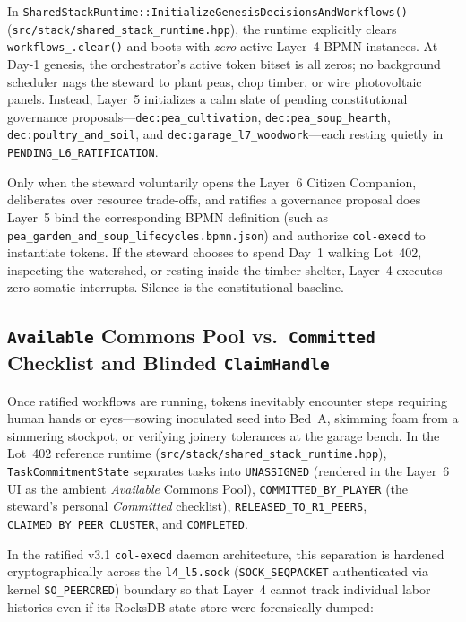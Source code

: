 In \texttt{SharedStackRuntime::InitializeGenesisDecisionsAndWorkflows()} (\texttt{src/stack/shared\_stack\_runtime.hpp}), the runtime explicitly clears \texttt{workflows\_.clear()} and boots with \emph{zero} active Layer~4 BPMN instances. At Day-1 genesis, the orchestrator's active token bitset is all zeros; no background scheduler nags the steward to plant peas, chop timber, or wire photovoltaic panels. Instead, Layer~5 initializes a calm slate of pending constitutional governance proposals---\texttt{dec:pea\_cultivation}, \texttt{dec:pea\_soup\_hearth}, \texttt{dec:poultry\_and\_soil}, and \texttt{dec:garage\_l7\_woodwork}---each resting quietly in \texttt{PENDING\_L6\_RATIFICATION}.

Only when the steward voluntarily opens the Layer~6 Citizen Companion, deliberates over resource trade-offs, and ratifies a governance proposal does Layer~5 bind the corresponding BPMN definition (such as \texttt{pea\_garden\_and\_soup\_lifecycles.bpmn.json}) and authorize \texttt{col-execd} to instantiate tokens. If the steward chooses to spend Day~1 walking Lot~402, inspecting the watershed, or resting inside the timber shelter, Layer~4 executes zero somatic interrupts. Silence is the constitutional baseline.

\subsection{\texttt{Available} Commons Pool vs.\ \texttt{Committed} Checklist and Blinded \texttt{ClaimHandle}}

Once ratified workflows are running, tokens inevitably encounter steps requiring human hands or eyes---sowing inoculated seed into Bed~A, skimming foam from a simmering stockpot, or verifying joinery tolerances at the garage bench. In the Lot~402 reference runtime (\texttt{src/stack/shared\_stack\_runtime.hpp}), \texttt{TaskCommitmentState} separates tasks into \texttt{UNASSIGNED} (rendered in the Layer~6 UI as the ambient \emph{Available} Commons Pool), \texttt{COMMITTED\_BY\_PLAYER} (the steward's personal \emph{Committed} checklist), \texttt{RELEASED\_TO\_R1\_PEERS}, \texttt{CLAIMED\_BY\_PEER\_CLUSTER}, and \texttt{COMPLETED}.

In the ratified v3.1 \texttt{col-execd} daemon architecture, this separation is hardened cryptographically across the \texttt{l4\_l5.sock} (\texttt{SOCK\_SEQPACKET} authenticated via kernel \texttt{SO\_PEERCRED}) boundary so that Layer~4 cannot track individual labor histories even if its RocksDB state store were forensically dumped:

